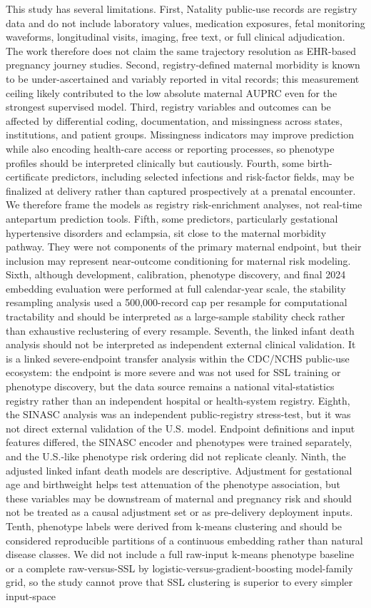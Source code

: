 \documentclass[pdflatex,sn-vancouver-num]{sn-jnl}
\begin{document}
This study has several limitations. First, Natality public-use records are registry data and do not include laboratory values, medication exposures, fetal monitoring waveforms, longitudinal visits, imaging, free text, or full clinical adjudication. The work therefore does not claim the same trajectory resolution as EHR-based pregnancy journey studies. Second, registry-defined maternal morbidity is known to be under-ascertained and variably reported in vital records; this measurement ceiling likely contributed to the low absolute maternal AUPRC even for the strongest supervised model. Third, registry variables and outcomes can be affected by differential coding, documentation, and missingness across states, institutions, and patient groups. Missingness indicators may improve prediction while also encoding health-care access or reporting processes, so phenotype profiles should be interpreted clinically but cautiously. Fourth, some birth-certificate predictors, including selected infections and risk-factor fields, may be finalized at delivery rather than captured prospectively at a prenatal encounter. We therefore frame the models as registry risk-enrichment analyses, not real-time antepartum prediction tools. Fifth, some predictors, particularly gestational hypertensive disorders and eclampsia, sit close to the maternal morbidity pathway. They were not components of the primary maternal endpoint, but their inclusion may represent near-outcome conditioning for maternal risk modeling. Sixth, although development, calibration, phenotype discovery, and final 2024 embedding evaluation were performed at full calendar-year scale, the stability resampling analysis used a 500,000-record cap per resample for computational tractability and should be interpreted as a large-sample stability check rather than exhaustive reclustering of every resample. Seventh, the linked infant death analysis should not be interpreted as independent external clinical validation. It is a linked severe-endpoint transfer analysis within the CDC/NCHS public-use ecosystem: the endpoint is more severe and was not used for SSL training or phenotype discovery, but the data source remains a national vital-statistics registry rather than an independent hospital or health-system registry. Eighth, the SINASC analysis was an independent public-registry stress-test, but it was not direct external validation of the U.S. model. Endpoint definitions and input features differed, the SINASC encoder and phenotypes were trained separately, and the U.S.-like phenotype risk ordering did not replicate cleanly. Ninth, the adjusted linked infant death models are descriptive. Adjustment for gestational age and birthweight helps test attenuation of the phenotype association, but these variables may be downstream of maternal and pregnancy risk and should not be treated as a causal adjustment set or as pre-delivery deployment inputs. Tenth, phenotype labels were derived from k-means clustering and should be considered reproducible partitions of a continuous embedding rather than natural disease classes. We did not include a full raw-input k-means phenotype baseline or a complete raw-versus-SSL by logistic-versus-gradient-boosting model-family grid, so the study cannot prove that SSL clustering is superior to every simpler input-space 
\end{document}
